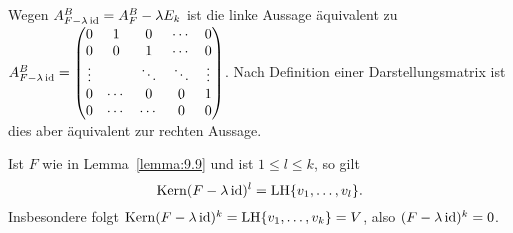\begin{beweis}
	Wegen $A_{F - \lambda \operatorname{id}}^B = A_F^B - \lambda E_k$ ist die linke Aussage äquivalent zu $A_{F - \lambda \operatorname{id}}^B = \begin{pmatrix}
		0 & 1 & 0 & \cdots & 0 \\ 
		0 & 0 & 1 & \cdots & 0 \\ 
		\vdots &  & \ddots & \ddots & \vdots \\ 
		0 & \cdots & 0 & 0 & 1 \\ 
		0 & \cdots & \cdots & 0 & 0
		\end{pmatrix}$.
	Nach Definition einer Darstellungsmatrix ist dies aber äquivalent zur rechten Aussage.  
\end{beweis}

\begin{bemerkung}
	\label{bem:9.10}
	Ist $F$ wie in Lemma~\ref{lemma:9.9} und ist $1 \leq l \leq k$, so gilt
	\[
		\operatorname{Kern}(F-\lambda \operatorname{id})^l = \operatorname{LH}\{v_1,\dots,v_l\}.
	\]
	Insbesondere folgt $\operatorname{Kern}(F- \lambda \operatorname{id})^k = \operatorname{LH}\{v_1,\dots,v_k\} = V$, also $(F-\lambda \operatorname{id})^k = 0$.
	

\end{bemerkung}
